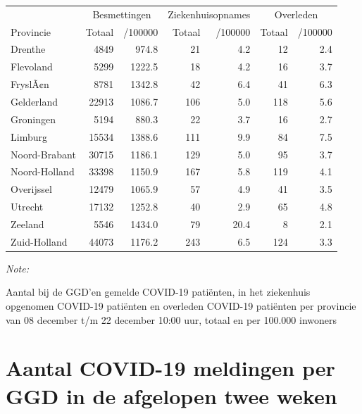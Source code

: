 \documentclass[
  english,
  man,floatsintext]{apa6}
\begin{document}
\begin{table}
\centering
\begin{threeparttable}
\begin{tabular}{lrrrrrr}
\toprule
\multicolumn{1}{c}{ } & \multicolumn{2}{c}{Besmettingen} & \multicolumn{2}{c}{Ziekenhuisopnames} & \multicolumn{2}{c}{Overleden} \\
\cmidrule(l{3pt}r{3pt}){2-3} \cmidrule(l{3pt}r{3pt}){4-5} \cmidrule(l{3pt}r{3pt}){6-7}
Provincie & Totaal & /100000 & Totaal & /100000 & Totaal & /100000\\
\midrule
Drenthe & 4849 & 974.8 & 21 & 4.2 & 12 & 2.4\\
Flevoland & 5299 & 1222.5 & 18 & 4.2 & 16 & 3.7\\
FryslÃ¢n & 8781 & 1342.8 & 42 & 6.4 & 41 & 6.3\\
Gelderland & 22913 & 1086.7 & 106 & 5.0 & 118 & 5.6\\
Groningen & 5194 & 880.3 & 22 & 3.7 & 16 & 2.7\\
Limburg & 15534 & 1388.6 & 111 & 9.9 & 84 & 7.5\\
Noord-Brabant & 30715 & 1186.1 & 129 & 5.0 & 95 & 3.7\\
Noord-Holland & 33398 & 1150.9 & 167 & 5.8 & 119 & 4.1\\
Overijssel & 12479 & 1065.9 & 57 & 4.9 & 41 & 3.5\\
Utrecht & 17132 & 1252.8 & 40 & 2.9 & 65 & 4.8\\
Zeeland & 5546 & 1434.0 & 79 & 20.4 & 8 & 2.1\\
Zuid-Holland & 44073 & 1176.2 & 243 & 6.5 & 124 & 3.3\\
\bottomrule
\end{tabular}
\begin{tablenotes}
\item \textit{Note: } 
\item Aantal bij de GGD’en gemelde COVID-19 patiënten, in het ziekenhuis opgenomen COVID-19 patiënten en overleden COVID-19 patiënten per provincie van 08 december t/m 22 december 10:00 uur, totaal en per 100.000 inwoners
\end{tablenotes}
\end{threeparttable}
\end{table}

\newpage

\hypertarget{aantal-covid-19-meldingen-per-ggd-in-de-afgelopen-twee-weken}{%
\section{Aantal COVID-19 meldingen per GGD in de afgelopen twee weken}\label{aantal-covid-19-meldingen-per-ggd-in-de-afgelopen-twee-weken}}
\end{document}
